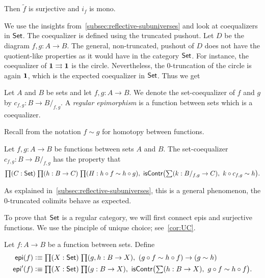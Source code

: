 \begin{lem}
Then $\tilde{f}$ is surjective and $i_f$ is mono.
\end{lem}

We use the insights from~\autoref{subsec:reflective-subuniverses} and look at coequalizers
in $\mathsf{Set}$. The coequalizer is defined using the truncated pushout. Let $D$ be the diagram $f,g:A\to B$.
The general, non-truncated, pushout of $D$ does not have the quotient-like properties as it would
have in the category $\mathsf{Set}$. For instance, the coequalizer of
$\mathbf{1}\rightrightarrows\mathbf{1}$ is the circle. Nevertheless,
the $0$-truncation of the circle is again $\mathbf{1}$, which is the
expected coequalizer in $\mathsf{Set}$. Thus we get

\begin{defn}
Let $A$ and $B$ be sets and let $f,g:A\to B$.
We denote the set-coequalizer of $f$ and $g$ by $c_{f,g}:B\to B/_{f,g}$. A
\emph{regular epimorphism} is a function between sets which is a coequalizer.
\end{defn}

Recall from  the notation $f \sim g$ for homotopy between functions.

\begin{lem}
Let $f,g:A\to B$ be functions between sets $A$ and $B$. The 
{set-co}equalizer $c_{f,g}:B\to B/_{f,g}$ has the property that
\begin{equation*}
\prd{C:\set}{h:B\to C}{H:h\circ f\sim h\circ g}
\mathsf{isContr}\big(\sm{k:B/_{f,g}\to C} k\circ c_{f,g}\sim h\big).
\end{equation*}
\end{lem}

As explained in~\autoref{subsec:reflective-subuniverses}, this is a general phenomenon, the 0-truncated colimits behave as expected.

To prove that $\mathsf{Set}$ is a regular category, we will first connect epis and surjective functions. 
We use the pinciple of unique choice; see~\autoref{cor:UC}. 

\begin{defn}
Let $f:A\to B$ be a function between sets. Define
\begin{align*}
\mathsf{epi}(f) & \defeq \prd{X:\set}{g,h:B\to X}
(g\circ f\sim h\circ f)\to (g\sim h)\\
\mathsf{epi}'(f) & \defeq\prd{X:\set}{g:B\to X}
\mathsf{isContr}\big(\sm{h:B\to X} g\circ f\sim h\circ f\big).
\end{align*}
\end{defn}

